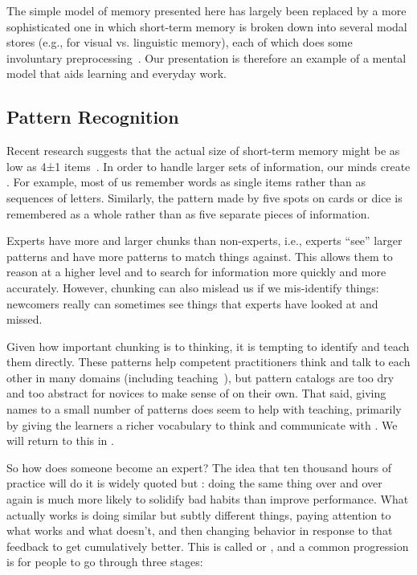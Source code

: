 The simple model of memory presented here has largely been replaced by a more sophisticated one
in which short-term memory is broken down into several modal stores
(e.g., for visual vs. linguistic memory),
each of which does some involuntary preprocessing~\cite{Mill2016a}.
Our presentation is therefore an example of a mental model that aids learning and everyday work.

\subsection*{Pattern Recognition}

Recent research suggests that the actual size of short-term memory
might be as low as 4±1 items~\cite{Dida2016}.
In order to handle larger sets of information,
our minds create .
For example,
most of us remember words as single items rather than as sequences of letters.
Similarly,
the pattern made by five spots on cards or dice is remembered as a whole
rather than as five separate pieces of information.

Experts have more and larger chunks than non-experts,
i.e., experts ``see'' larger patterns and have more patterns to match things against.
This allows them to reason at a higher level
and to search for information more quickly and more accurately.
However,
chunking can also mislead us if we mis-identify things:
newcomers really can sometimes see things that experts have looked at and missed.

Given how important chunking is to thinking,
it is tempting to identify 
and teach them directly.
These patterns help competent practitioners think and talk to each other in many domains (including teaching~\cite{Berg2012}),
but pattern catalogs are too dry and too abstract for novices to make sense of on their own.
That said,
giving names to a small number of patterns does seem to help with teaching,
primarily by giving the learners a richer vocabulary to think and communicate with \cite{Kuit2004,Byck2005,Saja2006}.
We will return to this in .


So how does someone become an expert?
The idea that ten thousand hours of practice will do it is widely quoted
but :
doing the same thing over and over again is much more likely to solidify bad habits than improve performance.
What actually works is doing similar but subtly different things,
paying attention to what works and what doesn't,
and then changing behavior in response to that feedback to get cumulatively better.
This is called 
or ,
and a common progression is for people to go through three stages:


